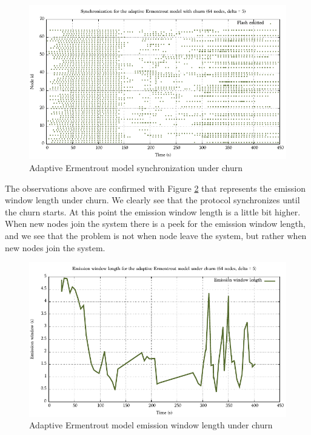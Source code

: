 \documentclass[a4paper, 11pt]{article}
\theoremstyle{plain}
\theoremstyle{definition}
\begin{document}
     \begin{figure}[h]
       \centering
       \includegraphics[width=\textwidth]{../Plots/Firefly-er-64nodes-churn-d5-10.pdf}
       \caption{Adaptive Ermentrout model synchronization under churn}
       \label{fig:er-churn-sync}
     \end{figure}

     The observations above are confirmed with Figure \ref{fig:er-churn-ewl} that represents the emission
     window length under churn. We clearly see that the protocol synchronizes until the churn starts. At this
     point the emission window length is a little bit higher. When new nodes join the system there is a peek
     for the emission window length, and we see that the problem is not when node leave the system, but rather
     when new nodes join the system.

     \begin{figure}[h]
       \centering
       \includegraphics[width=\textwidth]{../Plots/Firefly-er-64nodes-churn-d5-10-ewl.pdf}
       \caption{Adaptive Ermentrout model emission window length under churn}
       \label{fig:er-churn-ewl}
     \end{figure}
\end{document}
